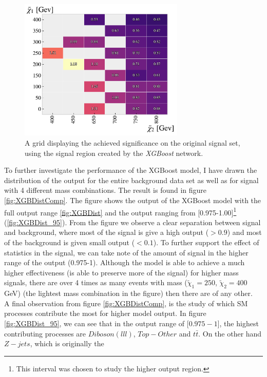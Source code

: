 \begin{figure}
    \centering
    \includegraphics[width=0.7\textwidth]{Figures/MLResults/XGB/SUSY/Grid/XGBGridSig.pdf}
    \caption{A grid displaying the achieved significance on the original signal set, using the signal region 
    created by the \emph{XGBoost} network.}
    \label{fig:XGBoost}
\end{figure}
To further investigate the performance of the XGBoost model, I have drawn the distribution of the output for the 
entire background data set as well as for signal with 4 different mass combinations. The result is found in figure 
\ref{fig:XGBDistComp}. The figure shows the output of the XGBoost model with the full output range \ref{fig:XGBDist}
and the output ranging from [0.975-1.00]\footnote{This interval was chosen to study the higher output region.} (\ref{fig:XGBDist_95}). 
From the figure we observe a clear separation between 
signal and background, where most of the signal is give a high output ($>0.9$) and most of the background is given small
output ($<0.1$). To further support the effect of statistics in the signal, we can take note of the 
amount of signal in the higher range of the output (0.975-1). Although the model is able to achieve a much higher 
effectiveness (is able to preserve more of the signal) for higher mass signals, there are over 4 times as many 
events with mass ($\tilde{\chi}_1=250$, $\tilde{\chi}_2=400$GeV) (the lightest mass combination in the figure) then there 
are of any other.
\\
A final observation from figure \ref{fig:XGBDistComp}, is the study of which \ac{SM} processes contribute the most 
for higher model output. In figure \ref{fig:XGBDist_95}, we can see that in the output range of [$0.975-1$], the highest 
contributing processes are $Diboson(lll)$, $Top-Other$ and $t\bar{t}$. On the other hand $Z-jets$, which is originally the 
